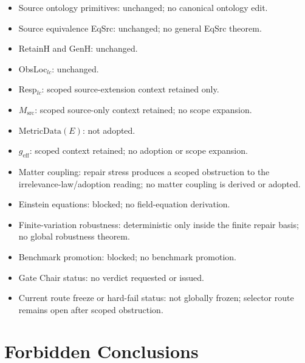 \begin{itemize}
  \item Source ontology primitives: unchanged; no canonical ontology edit.
  \item Source equivalence EqSrc: unchanged; no general EqSrc theorem.
  \item RetainH and GenH: unchanged.
  \item ObsLoc\(_{lc}\): unchanged.
  \item Resp\(_{lc}\): scoped source-extension context retained only.
  \item \(M_{\mathrm{src}}\): scoped source-only context retained; no scope
    expansion.
  \item \(\mathrm{MetricData}(E)\): not adopted.
  \item \(g_{\mathrm{eff}}\): scoped context retained; no adoption or scope
    expansion.
  \item Matter coupling: repair stress produces a scoped obstruction to the
    irrelevance-law/adoption reading; no matter coupling is derived or
    adopted.
  \item Einstein equations: blocked; no field-equation derivation.
  \item Finite-variation robustness: deterministic only inside the finite
    repair basis; no global robustness theorem.
  \item Benchmark promotion: blocked; no benchmark promotion.
  \item Gate Chair status: no verdict requested or issued.
  \item Current route freeze or hard-fail status: not globally frozen; selector
    route remains open after scoped obstruction.
\end{itemize}

\section{Forbidden Conclusions}

